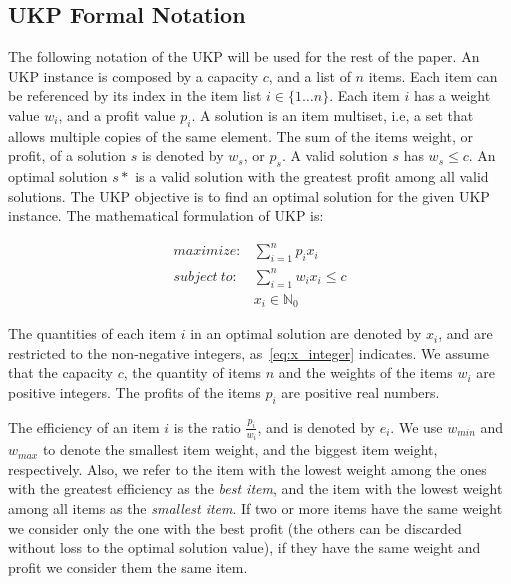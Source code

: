 \documentclass[runningheads,a4paper]{llncs}
\begin{document}

\subsection{UKP Formal Notation}

The following notation of the UKP will be used for the rest of the paper. An UKP instance is composed by a capacity \(c\), and a list of \(n\) items.
Each item can be referenced by its index in the item list \(i \in \{1\dots n\}\). 
Each item \(i\) has a weight value \(w_i\), and a profit value \(p_i\).
A solution is an item multiset, i.e, a set that allows multiple copies of the same element.
The sum of the items weight, or profit, of a solution \(s\) is denoted by \(w_s\), or \(p_s\).
A valid solution \(s\) has \(w_s \leq c\).
An optimal solution \(s*\) is a valid solution with the greatest profit among all valid solutions.
The UKP objective is to find an optimal solution for the given UKP instance. 
The mathematical formulation of UKP is:

\begin{align}
  maximize: &\sum_{i=1}^n p_i x_i\label{eq:objfun}\\
subject~to: &\sum_{i=1}^n w_i x_i \leq c\label{eq:capcons}\\
            &x_i \in \mathbb{N}_0\label{eq:x_integer}
\end{align}

The quantities of each item \(i\) in an optimal solution are denoted by \(x_i\), and are restricted to the non-negative integers, as~\eqref{eq:x_integer} indicates. 
We assume that the capacity \(c\), the quantity of items \(n\) and the weights of the items \(w_i\) are positive integers. 
The profits of the items \(p_i\) are positive real numbers.

The efficiency of an item \(i\) is the ratio \(\frac{p_i}{w_i}\), and is denoted by \(e_i\). 
We use \(w_{min}\) and \(w_{max}\) to denote the smallest item weight, and the biggest item weight, respectively. 
Also, we refer to the item with the lowest weight among the ones with the greatest efficiency as the \emph{best item}, 
and the item with the lowest weight among all items as the \emph{smallest item}.
If two or more items have the same weight we consider only the one with the best profit (the others can be discarded without loss to the optimal solution value), if they have the same weight and profit we consider them the same item.
\end{document}
